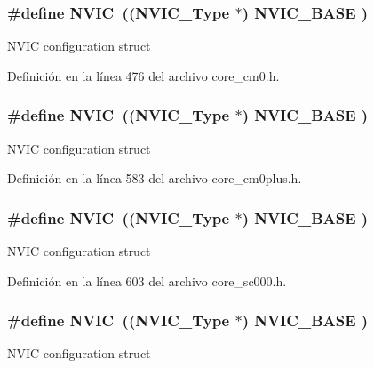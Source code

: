 \subsubsection[{\texorpdfstring{N\+V\+IC}{NVIC}}]{\setlength{\rightskip}{0pt plus 5cm}\#define N\+V\+IC~(({\bf N\+V\+I\+C\+\_\+\+Type}      $\ast$)     {\bf N\+V\+I\+C\+\_\+\+B\+A\+SE}     )}\hypertarget{group___c_m_s_i_s__core__base_gac8e97e8ce56ae9f57da1363a937f8a17}{}\label{group___c_m_s_i_s__core__base_gac8e97e8ce56ae9f57da1363a937f8a17}
N\+V\+IC configuration struct 

Definición en la línea 476 del archivo core\+\_\+cm0.\+h.

\subsubsection[{\texorpdfstring{N\+V\+IC}{NVIC}}]{\setlength{\rightskip}{0pt plus 5cm}\#define N\+V\+IC~(({\bf N\+V\+I\+C\+\_\+\+Type}      $\ast$)     {\bf N\+V\+I\+C\+\_\+\+B\+A\+SE}     )}\hypertarget{group___c_m_s_i_s__core__base_gac8e97e8ce56ae9f57da1363a937f8a17}{}\label{group___c_m_s_i_s__core__base_gac8e97e8ce56ae9f57da1363a937f8a17}
N\+V\+IC configuration struct 

Definición en la línea 583 del archivo core\+\_\+cm0plus.\+h.

\subsubsection[{\texorpdfstring{N\+V\+IC}{NVIC}}]{\setlength{\rightskip}{0pt plus 5cm}\#define N\+V\+IC~(({\bf N\+V\+I\+C\+\_\+\+Type}      $\ast$)     {\bf N\+V\+I\+C\+\_\+\+B\+A\+SE}     )}\hypertarget{group___c_m_s_i_s__core__base_gac8e97e8ce56ae9f57da1363a937f8a17}{}\label{group___c_m_s_i_s__core__base_gac8e97e8ce56ae9f57da1363a937f8a17}
N\+V\+IC configuration struct 

Definición en la línea 603 del archivo core\+\_\+sc000.\+h.

\subsubsection[{\texorpdfstring{N\+V\+IC}{NVIC}}]{\setlength{\rightskip}{0pt plus 5cm}\#define N\+V\+IC~(({\bf N\+V\+I\+C\+\_\+\+Type}      $\ast$)     {\bf N\+V\+I\+C\+\_\+\+B\+A\+SE}     )}\hypertarget{group___c_m_s_i_s__core__base_gac8e97e8ce56ae9f57da1363a937f8a17}{}\label{group___c_m_s_i_s__core__base_gac8e97e8ce56ae9f57da1363a937f8a17}
N\+V\+IC configuration struct 


